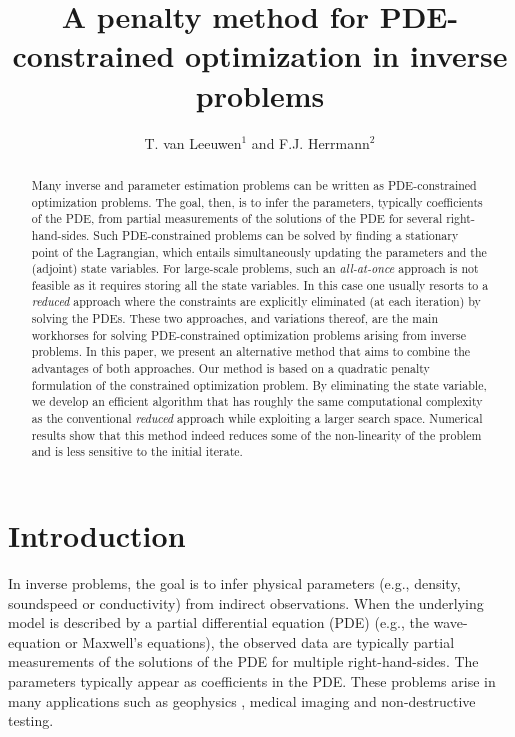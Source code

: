 \documentclass{iopart}
\begin{document}
\title[A penalty method for inverse problems]{A penalty method for PDE-constrained optimization in inverse problems}
\author{T. van Leeuwen$^1$ and F.J. Herrmann$^2$}
\address{$^1$Mathematical Institute, Utrecht University, Utrecht, the Netherlands.\\
$^2$ Dept. of Earth, Ocean and Atmospheric Sciences, University of British Columbia, Vancouver (BC), Canada.}

\begin{abstract}
Many inverse and parameter estimation problems can be written as PDE-constrained optimization problems. The goal, then, is to infer the parameters, typically coefficients of the PDE, from partial measurements of the solutions of the PDE for several right-hand-sides. Such PDE-constrained problems can be solved by finding a stationary point of the Lagrangian, which entails simultaneously updating the parameters and the (adjoint) state variables. For large-scale problems, such an \emph{all-at-once} approach is not feasible as it requires storing all the state variables. In this case one usually resorts to a \emph{reduced} approach where the constraints are explicitly eliminated (at each iteration) by solving the PDEs. These two approaches, and variations thereof, are the main workhorses for solving PDE-constrained optimization problems arising from inverse problems. In this paper, we present an alternative method that aims to combine the advantages of both approaches. Our method is based on a quadratic penalty formulation of the constrained optimization problem. By eliminating the state variable, we develop an efficient algorithm that has roughly the same computational complexity as the conventional \emph{reduced} approach while exploiting a larger search space. Numerical results show that this method indeed reduces some of the non-linearity of the problem and is less sensitive to the initial iterate.
\end{abstract}

\maketitle

\section{Introduction}
In inverse problems, the goal is to infer physical parameters (e.g., density, soundspeed or conductivity) from indirect observations. When the underlying model is described by a partial differential equation (PDE) (e.g., the wave-equation or Maxwell's equations), the observed data are typically partial measurements of the solutions of the PDE for multiple right-hand-sides. The parameters typically appear as coefficients in the PDE. These problems arise in many applications such as geophysics \cite{tarantola82,Haber2004,Epanomeritakis08,vanLeeuwen20133DFWI}, medical imaging \cite{Abdoulaev2005,Wang2015} and non-destructive testing.
\end{document}
